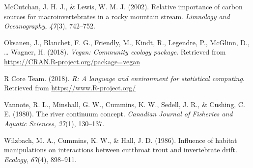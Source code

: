 \documentclass[double,12pt]{beavtex}
\begin{document}
  \hypertarget{ref-McCutchan2002}{}
  McCutchan, J. H. J., \& Lewis, W. M. J. (2002). Relative importance of
  carbon sources for macroinvertebrates in a rocky mountain stream.
  \emph{Limnology and Oceanography}, \emph{47}(3), 742--752.
  
  \hypertarget{ref-vegan}{}
  Oksanen, J., Blanchet, F. G., Friendly, M., Kindt, R., Legendre, P.,
  McGlinn, D., \ldots{} Wagner, H. (2018). \emph{Vegan: Community ecology
  package}. Retrieved from \url{https://CRAN.R-project.org/package=vegan}
  
  \hypertarget{ref-R-base}{}
  R Core Team. (2018). \emph{R: A language and environment for statistical
  computing}. Retrieved from \url{https://www.R-project.org/}
  
  \hypertarget{ref-Vannote1980}{}
  Vannote, R. L., Minshall, G. W., Cummins, K. W., Sedell, J. R., \&
  Cushing, C. E. (1980). The river continuum concept. \emph{Canadian
  Journal of Fisheries and Aquatic Sciences}, \emph{37}(1), 130--137.
  
  \hypertarget{ref-Wilzbach1986}{}
  Wilzbach, M. A., Cummins, K. W., \& Hall, J. D. (1986). Influence of
  habitat manipulations on interactions between cutthroat trout and
  invertebrate drift. \emph{Ecology}, \emph{67}(4), 898--911.
\end{document}

